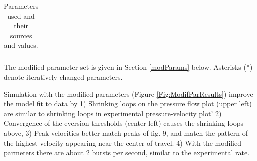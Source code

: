 \documentclass[letterpaper]{article}
\begin{document}
\begin{table}
\begin{tabular}{l|l|l|l|l|l}
\end{tabular}
\caption{Parameters used and their sources and values. }
\end{table}\label{Tab:paramClass}

\vspace{0.175in}

The modified parameter set is given in Section \ref{modParams} below.  Asterisks (*) denote iteratively changed parameters.

Simulation with the modified parameters (Figure \ref{Fig:ModifParResults}) improve the model fit to data by
    1) Shrinking loops on the pressure flow plot (upper left) are similar
  to shrinking loops in experimental pressure-velocity plot'
    2) Convergence of the eversion thresholds (center left) causes the shrinking loops above,
    3) Peak velocities better match peaks of fig. 9, and match the pattern of the highest velocity
  appearing near the center of travel.
    4) With the modified parmeters there are about 2 bursts per second, similar to the experimental rate.
\end{document}
